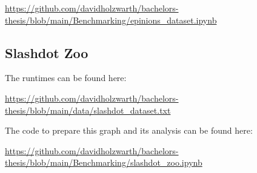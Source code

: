 \url{https://github.com/davidholzwarth/bachelors-thesis/blob/main/Benchmarking/epinions_dataset.ipynb}

\subsection{Slashdot Zoo}

The runtimes can be found here:

\url{https://github.com/davidholzwarth/bachelors-thesis/blob/main/data/slashdot_dataset.txt}

The code to prepare this graph and its analysis can be found here:

\url{https://github.com/davidholzwarth/bachelors-thesis/blob/main/Benchmarking/slashdot_zoo.ipynb}
